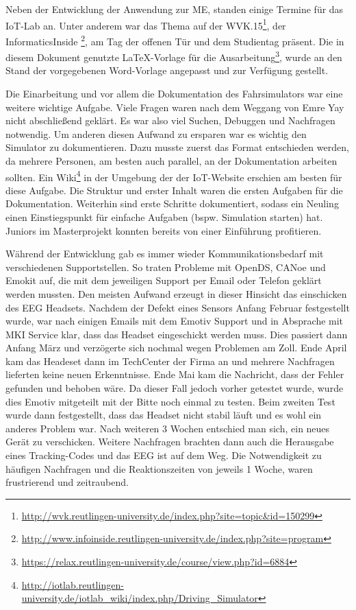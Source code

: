 \label{chap:master_project}
Neben der Entwicklung der Anwendung zur \acl{ME}, standen einige Termine für das IoT-Lab an. Unter anderem war das Thema auf der WVK.15\footnote{\url{http://wvk.reutlingen-university.de/index.php?site=topic&id=150299}}, der InformaticsInside \footnote{\url{http://www.infoinside.reutlingen-university.de/index.php?site=program}}, am Tag der offenen Tür und dem Studientag präsent. 
Die in diesem Dokument genutzte \LaTeX -Vorlage für die Ausarbeitung\footnote{\url{https://relax.reutlingen-university.de/course/view.php?id=6884}}, wurde an den Stand der vorgegebenen Word-Vorlage angepasst und zur Verfügung gestellt.

Die Einarbeitung und vor allem die Dokumentation des Fahrsimulators war eine weitere wichtige Aufgabe. Viele Fragen waren nach dem Weggang von Emre Yay nicht abschließend geklärt. Es war also viel Suchen, Debuggen und Nachfragen notwendig. Um anderen diesen Aufwand zu ersparen war es wichtig den Simulator zu dokumentieren. Dazu musste zuerst das Format entschieden werden, da mehrere Personen, am besten auch parallel, an der Dokumentation arbeiten sollten. Ein Wiki\footnote{\url{http://iotlab.reutlingen-university.de/iotlab_wiki/index.php/Driving_Simulator}} in der Umgebung der der IoT-Website erschien am besten für diese Aufgabe. Die Struktur und erster Inhalt waren die ersten Aufgaben für die Dokumentation. Weiterhin sind erste Schritte dokumentiert, sodass ein Neuling einen Einstiegspunkt für einfache Aufgaben (bspw. Simulation starten) hat. Juniors im Masterprojekt konnten bereits von einer Einführung profitieren.

Während der Entwicklung gab es immer wieder Kommunikationsbedarf mit verschiedenen Supportstellen. So traten Probleme mit OpenDS, CANoe und Emokit auf, die mit dem jeweiligen Support per Email oder Telefon geklärt werden mussten. Den meisten Aufwand erzeugt in dieser Hinsicht das einschicken des EEG Headsets. Nachdem der Defekt eines Sensors Anfang Februar festgestellt wurde, war nach einigen Emails mit dem Emotiv Support und in Absprache mit MKI Service klar, dass das Headset eingeschickt werden muss. Dies passiert dann Anfang März und verzögerte sich nochmal wegen Problemen am Zoll. Ende April kam das Headeset dann im TechCenter der Firma an und mehrere Nachfragen lieferten keine neuen Erkenntnisse. Ende Mai kam die Nachricht, dass der Fehler gefunden und behoben wäre. Da dieser Fall jedoch vorher getestet wurde, wurde dies Emotiv mitgeteilt mit der Bitte noch einmal zu testen. Beim zweiten Test wurde dann festgestellt, dass das Headset nicht stabil läuft und es wohl ein anderes Problem war. Nach weiteren 3 Wochen entschied man sich, ein neues Gerät zu verschicken. Weitere Nachfragen brachten dann auch die Herausgabe eines Tracking-Codes und das EEG ist auf dem Weg. Die Notwendigkeit zu häufigen Nachfragen und die Reaktionszeiten von jeweils 1 Woche, waren frustrierend und zeitraubend.
